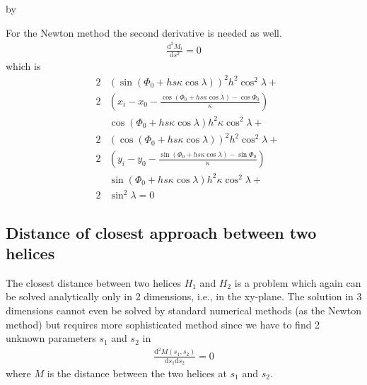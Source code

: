 \documentclass[twoside]{article}
\newcommand{\entrylabel}[1]{\mbox{\textbf{{#1}}}\hfil}%
\newenvironment{entry}
{\begin{list}{}%
    {\renewcommand{\makelabel}{\entrylabel}%
     \setlength{\labelwidth}{90pt}%
     \setlength{\leftmargin}{\labelwidth}
     \advance\leftmargin by \labelsep%
      }%
    }%
  {\end{list}}
\newcommand{\Entrylabel}[1]%
{\raisebox{0pt}[1ex][0pt]{\makebox[\labelwidth][l]%
    {\parbox[t]{\labelwidth}{\hspace{0pt}\textbf{{#1}}}}}}
\newenvironment{Entry}%
{\renewcommand{\entrylabel}{\Entrylabel}\begin{entry}}%
  {\end{entry}}
\begin{document}
\begin{description}
\begin{Entry}
For the Newton method the second derivative is needed as well.
\begin{eqnarray}
\frac{\mathrm{d}^2M_i}{\mathrm{d}s^2}  = 0
\end{eqnarray}
which is
\begin{eqnarray}
    &2&\left (\sin(\Phi_0+hs\kappa\cos\lambda)\right )^{2}{h}^{2}\cos^{2}\lambda + \nonumber \\
    &2&\left (x_i-{x_0}-{\frac {\cos(\Phi_0+hs\kappa\cos\lambda)-\cos\Phi_0}{\kappa}}\right ) \nonumber \\
    & &\cos(\Phi_0+hs\kappa\cos\lambda){h}^{2}\kappa \cos^{2}\lambda + \nonumber \\
    &2&\left (\cos(\Phi_0+hs\kappa\cos\lambda)\right )^{2}{h}^{2}\cos^{2}\lambda +  \nonumber \\
    &2&\left (y_i-{y_0}-{\frac {\sin(
                \Phi_0+hs\kappa\cos\lambda)-\sin\Phi_0}{\kappa}}\right ) \nonumber \\
    & &\sin(\Phi_0+hs\kappa\cos\lambda){h}^{2}\kappa
    \cos^{2}\lambda + \nonumber \\
    &2&\sin^2\lambda = 0 
\end{eqnarray}

\subsection{Distance of closest approach between two helices}
 The closest distance between two helices
$H_1$ and $H_2$ is a problem which again can be solved analytically
only in 2 dimensions, i.e., in the xy-plane.  The solution in 3
dimensions cannot even be solved by standard numerical methods (as the
Newton method) but requires more sophisticated method since we have to
find 2 unknown parameters $s_1$ and $s_2$ in
\begin{eqnarray}
\frac{\mathrm{d}^2 M(s_1, s_2)}{\mathrm{d} s_1 \mathrm{d} s_2} = 0
\end{eqnarray}
where $M$ is the distance between the two helices at $s_1$ and $s_2$.


\end{Entry}
\end{description}
\end{document}
